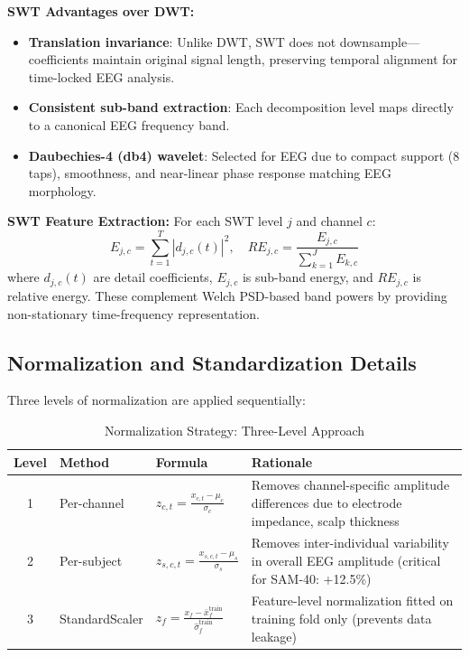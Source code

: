 \documentclass[11pt,a4paper]{article}
\begin{document}
\noindent\textbf{SWT Advantages over DWT:}
\begin{itemize}[leftmargin=*]
\item \textbf{Translation invariance}: Unlike DWT, SWT does not downsample---coefficients maintain original signal length, preserving temporal alignment for time-locked EEG analysis.
\item \textbf{Consistent sub-band extraction}: Each decomposition level maps directly to a canonical EEG frequency band.
\item \textbf{Daubechies-4 (db4) wavelet}: Selected for EEG due to compact support (8 taps), smoothness, and near-linear phase response matching EEG morphology.
\end{itemize}

\noindent\textbf{SWT Feature Extraction:}
For each SWT level $j$ and channel $c$:
\begin{equation}
E_{j,c} = \sum_{t=1}^{T} |d_{j,c}(t)|^2, \quad RE_{j,c} = \frac{E_{j,c}}{\sum_{k=1}^{J} E_{k,c}}
\end{equation}
where $d_{j,c}(t)$ are detail coefficients, $E_{j,c}$ is sub-band energy, and $RE_{j,c}$ is relative energy. These complement Welch PSD-based band powers by providing non-stationary time-frequency representation.

\subsection{Normalization and Standardization Details}

Three levels of normalization are applied sequentially:

\begin{table}[H]
\centering
\caption{Normalization Strategy: Three-Level Approach}
\small
\begin{tabular}{clp{4cm}p{5cm}}
\toprule
\textbf{Level} & \textbf{Method} & \textbf{Formula} & \textbf{Rationale} \\
\midrule
1 & Per-channel & $z_{c,t} = \frac{x_{c,t} - \mu_c}{\sigma_c}$ & Removes channel-specific amplitude differences due to electrode impedance, scalp thickness \\
2 & Per-subject & $z_{s,c,t} = \frac{x_{s,c,t} - \mu_s}{\sigma_s}$ & Removes inter-individual variability in overall EEG amplitude (critical for SAM-40: +12.5\%) \\
3 & StandardScaler & $z_{f} = \frac{x_{f} - \bar{x}_f^{\text{train}}}{\hat{\sigma}_f^{\text{train}}}$ & Feature-level normalization fitted on training fold only (prevents data leakage) \\
\bottomrule
\end{tabular}
\end{table}
\end{document}
